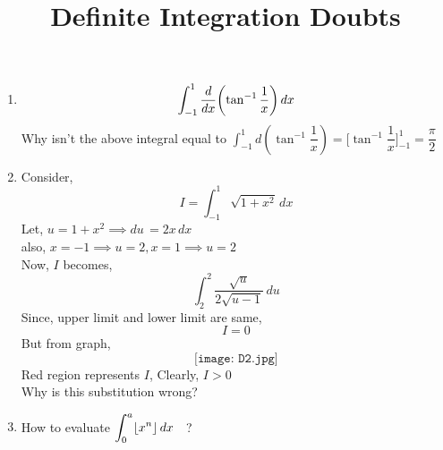 \documentclass{article}
\title{Definite Integration Doubts}
\author{}
\date{}
\begin{document}
\maketitle

\section*{}
\begin{enumerate}[$\mathcal{D}$1.]
   \item $$\displaystyle\int_{-1}^{1} \dv{x}(\tan^{-1} \dfrac{1}{x} ) \, dx $$
Why isn't the above integral equal to $\displaystyle\int_{-1}^{1} d\left(\tan^{-1} \dfrac{1}{x} \right)=\biggl[\tan^{-1} \dfrac{1}{x}\biggr]_{-1}^{1}=\dfrac{\pi}{2} $
   \item Consider, $$I=\displaystyle\int_{-1}^{1} \sqrt{1+x^2} \, dx $$
   Let, $u=1+x^2 \implies du \, =2x \, dx$ \\
   also, $x=-1 \implies u = 2, x=1 \implies u = 2$\\
   Now, $I$ becomes, $$\displaystyle\int_{2}^{2} \dfrac{\sqrt{u}}{2 \sqrt{u-1}} \, du $$
   Since, upper limit and lower limit are same, $$\boxed{I=0}$$
   But from graph, 
   $$\texttt{[image: D2.jpg]}$$
   Red region represents $I$, Clearly, $I>0$\\
   Why is this substitution wrong?
   \item How to evaluate $\displaystyle\int_{0}^{a} \lfloor x^n \rfloor \, dx  \hspace{2mm}$ ? 
\end{enumerate}
\end{document}

